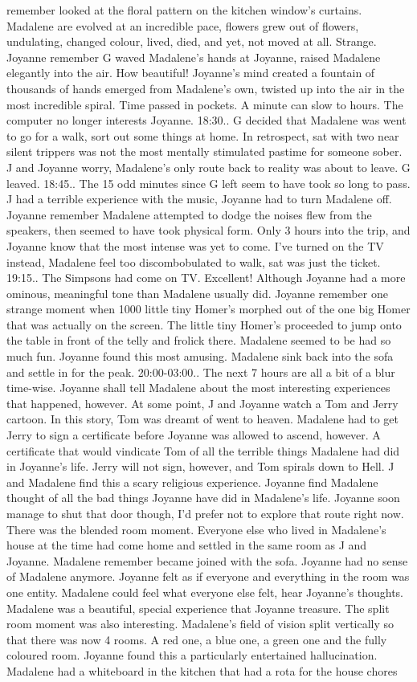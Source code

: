 \documentclass[12pt]{book}
\begin{document}
remember looked at the floral pattern on the kitchen window's curtains. Madalene are evolved at an incredible pace, flowers grew out of flowers, undulating, changed colour, lived, died, and yet, not moved at all. Strange. Joyanne remember G waved Madalene's hands at Joyanne, raised Madalene elegantly into the air. How beautiful! Joyanne's mind created a fountain of thousands of hands emerged from Madalene's own, twisted up into the air in the most incredible spiral. Time passed in pockets. A minute can slow to hours. The computer no longer interests Joyanne. 18:30.. G decided that Madalene was went to go for a walk, sort out some things at home. In retrospect, sat with two near silent trippers was not the most mentally stimulated pastime for someone sober. J and Joyanne worry, Madalene's only route back to reality was about to leave. G leaved. 18:45.. The 15 odd minutes since G left seem to have took so long to pass. J had a terrible experience with the music, Joyanne had to turn Madalene off. Joyanne remember Madalene attempted to dodge the noises flew from the speakers, then seemed to have took physical form. Only 3 hours into the trip, and Joyanne know that the most intense was yet to come. I've turned on the TV instead, Madalene feel too discombobulated to walk, sat was just the ticket. 19:15.. The Simpsons had come on TV. Excellent! Although Joyanne had a more ominous, meaningful tone than Madalene usually did. Joyanne remember one strange moment when 1000 little tiny Homer's morphed out of the one big Homer that was actually on the screen. The little tiny Homer's proceeded to jump onto the table in front of the telly and frolick there. Madalene seemed to be had so much fun. Joyanne found this most amusing. Madalene sink back into the sofa and settle in for the peak. 20:00-03:00.. The next 7 hours are all a bit of a blur time-wise. Joyanne shall tell Madalene about the most interesting experiences that happened, however. At some point, J and Joyanne watch a Tom and Jerry cartoon. In this story, Tom was dreamt of went to heaven. Madalene had to get Jerry to sign a certificate before Joyanne was allowed to ascend, however. A certificate that would vindicate Tom of all the terrible things Madalene had did in Joyanne's life. Jerry will not sign, however, and Tom spirals down to Hell. J and Madalene find this a scary religious experience. Joyanne find Madalene thought of all the bad things Joyanne have did in Madalene's life. Joyanne soon manage to shut that door though, I'd prefer not to explore that route right now. There was the blended room moment. Everyone else who lived in Madalene's house at the time had come home and settled in the same room as J and Joyanne. Madalene remember became joined with the sofa. Joyanne had no sense of Madalene anymore. Joyanne felt as if everyone and everything in the room was one entity. Madalene could feel what everyone else felt, hear Joyanne's thoughts. Madalene was a beautiful, special experience that Joyanne treasure. The split room moment was also interesting. Madalene's field of vision split vertically so that there was now 4 rooms. A red one, a blue one, a green one and the fully coloured room. Joyanne found this a particularly entertained hallucination. Madalene had a whiteboard in the kitchen that had a rota for the house chores 
\end{document}
